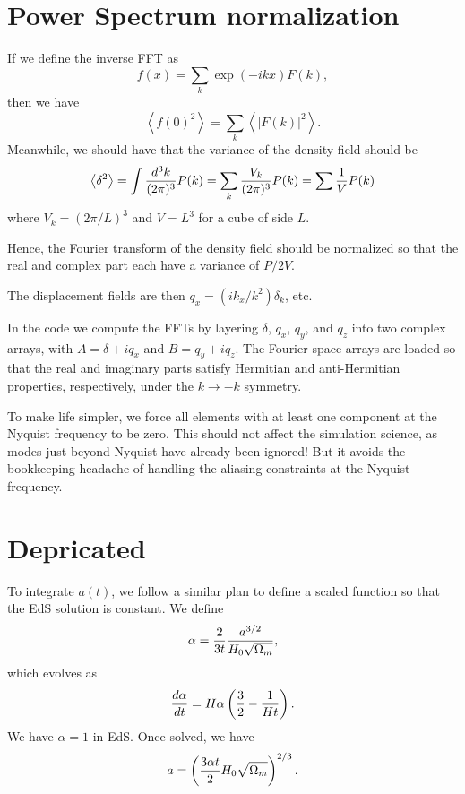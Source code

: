 \documentclass[11pt,preprint]{aastex}
\begin{document}
\section{Power Spectrum normalization}

If we define the inverse FFT as
\begin{equation}
f(x) = \sum_k \exp(-ikx) F(k),
\end{equation}
then we have 
\begin{equation}
\left<f(0)^2\right> = \sum_k \left<\left|F(k)\right|^2\right>.
\end{equation}
Meanwhile, we should have that the variance of the density field
should be 
\begin{equation}
\left<\delta^2\right> = \int {d^3 k\over (2\pi)^3} P(k)
= \sum_k {V_k\over (2\pi)^3} P(k) = \sum {1\over V} P(k)
\end{equation}
where $V_k = (2\pi/L)^3$ and $V=L^3$ for a cube of side $L$.

Hence, the Fourier transform of the density field should be normalized
so that the real and complex part each have a variance of $P/2V$.

The displacement fields are then $q_x = (ik_x/k^2) \delta_k$, etc.

In the code we compute the FFTs by layering $\delta$, $q_x$, $q_y$,
and $q_z$ into two complex arrays, with $A = \delta + iq_x$ and $B
= q_y+iq_z$.  The Fourier space arrays are loaded so that the real
and imaginary parts satisfy Hermitian and anti-Hermitian properties,
respectively, under the $k\rightarrow -k$ symmetry.

To make life simpler, we force all elements with at least one
component at the Nyquist frequency to be zero.  This should not
affect the simulation science, as modes just beyond Nyquist have
already been ignored!  But it avoids the bookkeeping headache of
handling the aliasing constraints at the Nyquist frequency.


\section{Depricated}

To integrate $a(t)$, we follow a similar plan to define a scaled function
so that the EdS solution is constant.  We define 
\begin{equation}
\alpha = {2\over 3t} {a^{3/2}\over H_0\sqrt{\Omega_m}},
\end{equation}
which evolves as
\begin{equation}
{d\alpha\over dt} = H\alpha \left({3\over2} - {1\over Ht}\right).
\end{equation}
We have $\alpha=1$ in EdS.  Once solved, we have
\begin{equation}
a = \left({3\alpha t\over 2} H_0\sqrt{\Omega_m}\right)^{2/3}.
\end{equation}
\end{document}
